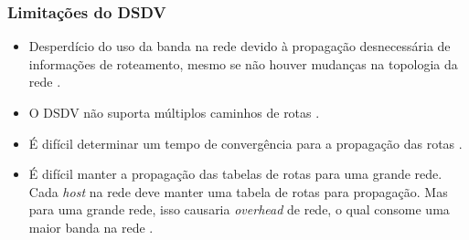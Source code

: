 \subsubsection{Limita\c{c}\~ oes do DSDV}
\begin{itemize}
	\item Desperd\'icio do uso da banda na rede devido \`a propaga\c{c}\~ao desnecess\'aria de informa\c{c}\~oes de roteamento, mesmo se n\~ao houver mudan\c{c}as na topologia da rede \cite{Patel00energyin}.	
	\item O DSDV n\~ao suporta m\'ultiplos caminhos de rotas \cite{gorantala}.
	\item \'E dif\'icil determinar um tempo de converg\^encia para a propaga\c{c}\~ao das rotas \cite{heg}.
	\item \'E dif\'icil manter a propaga\c{c}\~ao das tabelas de rotas para uma grande rede. Cada \textit{host} na rede deve manter uma tabela de rotas para propaga\c{c}\~ao. Mas para uma grande rede, isso causaria \textit{overhead} de rede, o qual consome uma maior banda na rede \cite{gorantala}.
\end{itemize}
